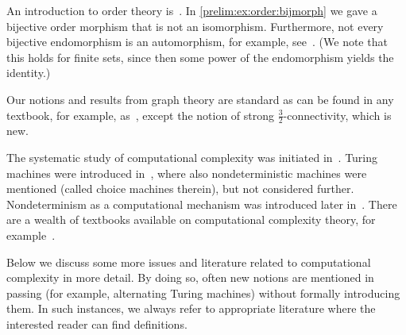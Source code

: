 An introduction to order theory is~\cite{davey1990introduction}.
In \cref{prelim:ex:order:bijmorph} we gave a bijective order morphism that is not an isomorphism.
Furthermore, not every bijective endomorphism is an automorphism, for example,
see~\cite{Kukiela2009_ReversibleBijectivelyRelatedPosets}. (We note that this holds for finite sets,
since then some power of the endomorphism yields the identity.)

Our notions and results from graph theory are standard as can be found in any
textbook, for example, as~\cite{diestel2017graph,harary1969graph}, 
except the notion of strong $\frac{3}{2}$-connectivity, which is new.

The systematic study of computational complexity was initiated in~\cite{HartmanisStearns1965}.
Turing machines were introduced in~\cite{turing1936computable}, where also nondeterministic
machines were mentioned (called choice machines therein), but not considered further. Nondeterminism
as a computational mechanism was introduced later in~\cite{DBLP:journals/ibmrd/RabinS59}.
There are a wealth of textbooks available on computational complexity theory,
for example~\cite{DBLP:books/daglib/0023084,DBLP:series/eatcs/BalcazarDG90,DBLP:series/txtcs/BalcazarDG95,HopUll79,sipser2012theory,DBLP:books/daglib/0088160}.

Below we discuss some more issues and literature related to computational complexity in more detail.
By doing so, often new notions are mentioned in passing (for example, alternating Turing machines) without
formally introducing them.
In such instances, we always refer to appropriate literature where the interested reader can find definitions.

